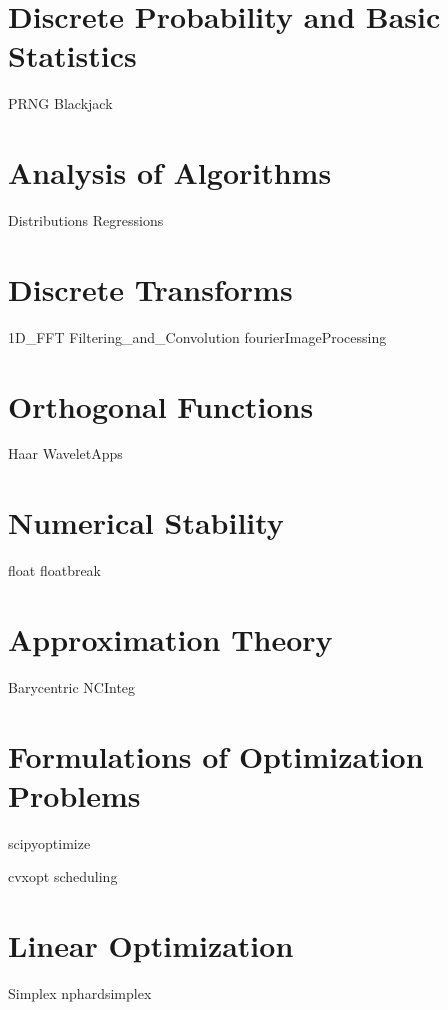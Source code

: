 \documentclass[nociteref]{newsiambook}
\begin{document}
\part{Discrete Probability and Basic Statistics}
{PRNG}
{Blackjack}


\part{Analysis of Algorithms}
{Distributions}
{Regressions}

\part{Discrete Transforms}
{1D_FFT}
{Filtering_and_Convolution}
{fourierImageProcessing}

\part{Orthogonal Functions}
{Haar}
{WaveletApps}

\part{Numerical Stability}
{float}
{floatbreak}

\part{Approximation Theory}
{Barycentric}
{NCInteg}

\part{Formulations of Optimization Problems}
{scipyoptimize}

{cvxopt}
{scheduling}

\part{Linear Optimization}
{Simplex}
{nphardsimplex}
\end{document}
